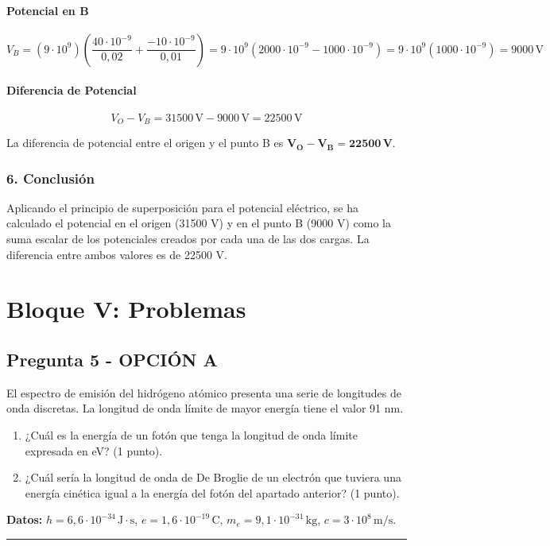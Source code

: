 \paragraph{Potencial en B}
$$V_B = (9\cdot10^9) \left( \frac{40\cdot10^{-9}}{0,02} + \frac{-10\cdot10^{-9}}{0,01} \right) = 9\cdot10^9 (2000\cdot10^{-9} - 1000\cdot10^{-9}) = 9\cdot10^9 (1000\cdot10^{-9}) = 9000 \, \text{V}$$
\paragraph{Diferencia de Potencial}
$$V_O - V_B = 31500 \, \text{V} - 9000 \, \text{V} = 22500 \, \text{V}$$
\begin{cajaresultado}
    La diferencia de potencial entre el origen y el punto B es $\boldsymbol{V_O - V_B = 22500 \, \textbf{V}}$.
\end{cajaresultado}

\subsubsection*{6. Conclusión}
\begin{cajaconclusion}
Aplicando el principio de superposición para el potencial eléctrico, se ha calculado el potencial en el origen (31500 V) y en el punto B (9000 V) como la suma escalar de los potenciales creados por cada una de las dos cargas. La diferencia entre ambos valores es de 22500 V.
\end{cajaconclusion}

\newpage

\section{Bloque V: Problemas}
\label{sec:moderna_2008_sep_ext}

\subsection{Pregunta 5 - OPCIÓN A}
\label{subsec:5A_2008_sep_ext}

\begin{cajaenunciado}
El espectro de emisión del hidrógeno atómico presenta una serie de longitudes de onda discretas. La longitud de onda límite de mayor energía tiene el valor 91 nm.
\begin{enumerate}
    \item ¿Cuál es la energía de un fotón que tenga la longitud de onda límite expresada en eV? (1 punto).
    \item ¿Cuál sería la longitud de onda de De Broglie de un electrón que tuviera una energía cinética igual a la energía del fotón del apartado anterior? (1 punto).
\end{enumerate}
\textbf{Datos:} $h=6,6\cdot10^{-34}\,\text{J}\cdot\text{s}$, $e=1,6\cdot10^{-19}\,\text{C}$, $m_e=9,1\cdot10^{-31}\,\text{kg}$, $c=3\cdot10^8\,\text{m/s}$.
\end{cajaenunciado}
\hrule

